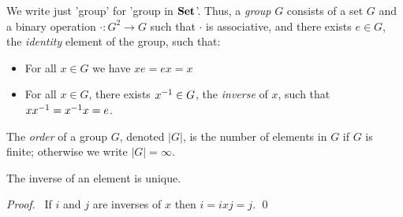 \begin{df}[Group]
We write just 'group' for 'group in $\mathbf{Set}$'. Thus, a \emph{group} $G$ consists of a set $G$ and a binary operation $\cdot : G^2 \rightarrow G$ such that $\cdot$ is associative, and there exists $e \in G$, the \emph{identity} element of the group, such that:
    \begin{itemize}
        \item For all $x \in G$ we have $xe = ex = x$
        \item For all $x \in G$, there exists ${x}^{-1} \in G$, the \emph{inverse} of $x$,
              such that $x {x}^{-1} = {x}^{-1} x = e$.
    \end{itemize}

    The \emph{order} of a group $G$, denoted $|G|$, is the number of elements in
    $G$ if $G$ is finite; otherwise we write $|G| = \infty$.
\end{df}

\begin{prop}
    \label{prop:grp-inv-unique}
    The inverse of an element is unique.
\end{prop}

\begin{proof}
    \pf\ If $i$ and $j$ are inverses of $x$ then $i = ixj = j$. \qed
\end{proof}

